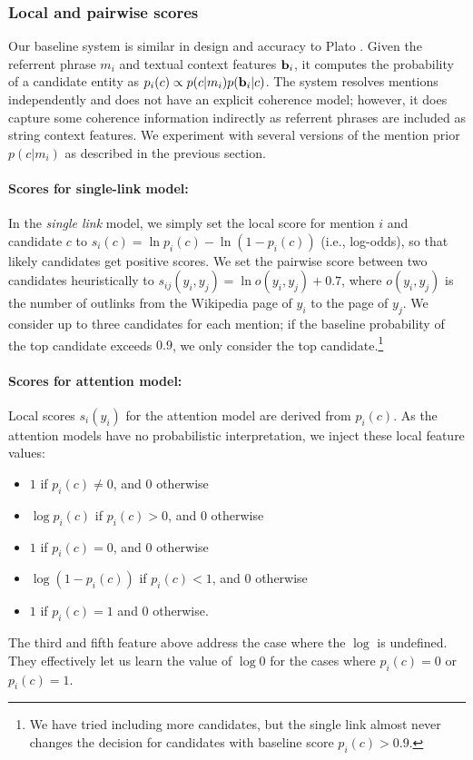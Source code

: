 \subsubsection{Local and pairwise scores}
\label{sec:expt:features}

Our baseline system is similar in design and accuracy to Plato \cite{Lazic2015}.
Given the referrent phrase $m_i$ and textual context features ${\bf b}_i$, it computes
the probability of a candidate entity as $p_i(c) \propto p(c|m_i)p({\bf b}_i|c)$. 
The system resolves mentions independently and does not have an explicit coherence model;
however, it does capture some coherence information indirectly as referrent phrases are
included as string context features. We experiment with several versions of the
mention prior $p(c|m_i)$ as described in the previous section.


\paragraph*{Scores for single-link model:}
In the \emph{single link} model, we simply set the local score for
mention $i$ and candidate $c$ to $s_i(c) = \ln p_i(c) - \ln (1 -
p_i(c))$ (i.e., log-odds), so that likely candidates get positive
scores.  We set the pairwise score between two candidates heuristically to
$s_{ij}(y_i, y_j) = \ln o(y_i, y_j) + 0.7$, where $o(y_i, y_j)$ is the number of
outlinks from the Wikipedia page of $y_i$ to the page of $y_j$.  We
consider up to three candidates for each mention; if the baseline
probability of the top candidate exceeds $0.9$, we only consider the top
candidate.\footnote{We have tried including more candidates, but the single link
almost never changes the decision for candidates with baseline score $p_i(c)>0.9$.}

\paragraph*{Scores for attention model:}
Local scores $s_i(y_i)$ for the attention model are derived from
$p_i(c)$.  As the attention models have no probabilistic
interpretation, we inject these local feature values:
\begin{itemize}
\item $1$ if $p_i(c)\ne 0$, and 0 otherwise
\item $\log p_i(c)$ if $p_i(c)>0$, and $0$ otherwise
\item $1$ if $p_i(c)=0$, and $0$ otherwise
\item $\log(1-p_i(c))$ if $p_i(c)<1$, and $0$ otherwise
\item $1$ if $p_i(c)=1$ and $0$ otherwise.
\end{itemize}
%
The third and fifth feature above address the case where the $\log$ is undefined. They effectively let us learn the value of $\log{0}$ for the
cases where $p_i(c)=0$ or $p_i(c)=1$.

